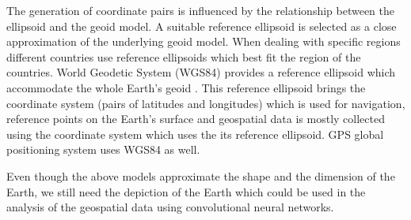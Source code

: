 The generation of coordinate pairs is influenced by the relationship between the ellipsoid and the geoid model. A suitable reference ellipsoid is selected as a close approximation of the underlying geoid model.
When dealing with specific regions different countries use reference ellipsoids which best fit the region of the countries.
World Geodetic System (WGS84) provides a reference ellipsoid which accommodate the whole Earth's geoid \cite{GISGEO_Ellipsoid}. This reference ellipsoid brings the coordinate system (pairs of latitudes and longitudes) which is used for navigation, reference points on the Earth's surface and geospatial data is mostly collected using the coordinate system which uses the its reference ellipsoid.
GPS global positioning system uses WGS84 as well\cite{GISGEO_WGS84}.

Even though the above models approximate the shape and the dimension of the Earth, we still need the depiction of the Earth which could be used in the analysis of the geospatial data using convolutional neural networks.